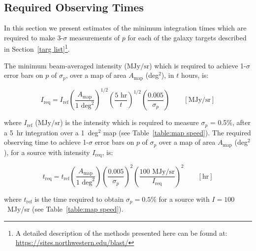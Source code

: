 
\subsection{Required Observing Times}\label{mapping speed}

In this section we present estimates of the minimum integration times which are required to make 3-$\sigma$ measurements of $p$ for each of the galaxy targets described in Section~\ref{targ list}\footnote{A detailed description of the methods presented here can be found at: \url{https://sites.northwestern.edu/blast/}}.

The minimum beam-averaged intensity ($\mathrm{MJy/sr}$) which is required to achieve 1-$\sigma$ error bars on $p$ of $\sigma_{p}$, over a map of area $A_{\mathrm{map}}$ (deg$^{2}$), in $t$ hours, is:

\begin{equation}\label{eq:Ireq}
  I_{\mathrm{req}} = I_{\mathrm{ref}} \left( \frac{A_{\mathrm{map}}}{1 \text{ deg}^{2}}  \right)^{1/2} \left( \frac{5 \text{ hr}}{t} \right)^{1/2} \left( \frac{0.005}{\sigma_{p} } \right) \qquad \left[ \mathrm{MJy/sr} \right]
\end{equation}

where $I_{\mathrm{ref}}$ ($\mathrm{MJy/sr}$) is the intensity which is required to measure $\sigma_{p}$ = 0.5\%, after a 5~hr integration over a 1~deg$^{2}$ map (see Table~\ref{table:map speed}). The required observing time to achieve 1-$\sigma$ error bars on $p$ of $\sigma_{p}$ over a map of area $A_{\mathrm{map}}$ (deg$^{2}$), for a source with intensity $I_{\mathrm{req}}$, is:

\begin{equation}\label{eq:treq}
  t_{\mathrm{req}} = t_{\mathrm{ref}} \left( \frac{A_{\mathrm{map}}}{1 \text{ deg}^{2}}  \right) \left( \frac{0.005}{\sigma_{p} } \right)^{2} \left(  \frac{100 \textrm{ MJy/sr}}{I_{\mathrm{req}}} \right)^{2} \qquad \left[ \mathrm{hr} \right]
\end{equation}

where $t_{\mathrm{ref}}$ is the time required to obtain $\sigma_{p} = 0.5$\% for a source with $I = 100$~MJy/sr (see Table~\ref{table:map speed}).

